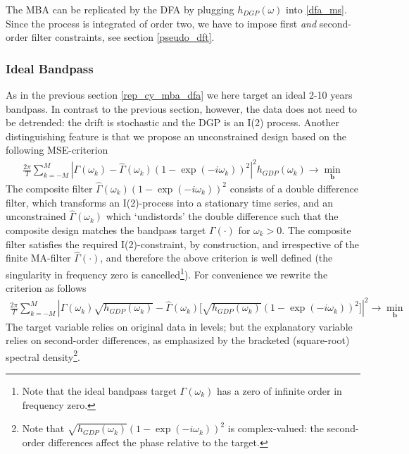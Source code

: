 \documentclass[a4paper]{book}
\begin{document}
The MBA can be replicated by the DFA by plugging $h_{DGP}(\omega)$ into \ref{dfa_ms}. Since the process is integrated of order two, we have to impose first \emph{and} second-order filter constraints, see section \ref{pseudo_dft}.  





\subsubsection{Ideal Bandpass}

As in the previous section \ref{rep_cy_mba_dfa} we here target an ideal 2-10 years bandpass. In contrast to the previous section, however, the data does not need to be detrended: the drift is stochastic and the DGP is an I(2) process. Another distinguishing feature is that we propose an unconstrained design based on the following MSE-criterion
\begin{eqnarray*}
\frac{2\pi}{T}\sum_{k=-M}^{M}\left|\Gamma(\omega_k)-\hat{\Gamma}(\omega_k) (1-\exp(-i\omega_k))^2\right|^2 h_{GDP}(\omega_k)\to\min_{\mathbf{b}} 
\end{eqnarray*}
The composite filter $\hat{\Gamma}(\omega_k) (1-\exp(-i\omega_k))^2$ consists of a double difference filter, which transforms an I(2)-process into a stationary time series, and an unconstrained $\hat{\Gamma}(\omega_k)$ which `undistords' the double difference such that the composite design matches the bandpass target $\Gamma(\cdot)$ for $\omega_k>0$. The composite filter satisfies the required I(2)-constraint, by construction, and irrespective of the finite MA-filter $\hat{\Gamma}(\cdot)$, and therefore the above criterion is well defined (the singularity in frequency zero is cancelled\footnote{Note that the ideal bandpass target $\Gamma(\omega_k)$ has a zero of infinite order in frequency zero.}). For convenience we rewrite the criterion as follows 
\begin{eqnarray*}
\frac{2\pi}{T}\sum_{k=-M}^{M}\left|\Gamma(\omega_k)\sqrt{h_{GDP}(\omega_k)}-\hat{\Gamma}(\omega_k)\bigg[\sqrt{h_{GDP}(\omega_k)} (1-\exp(-i\omega_k))^2\bigg]\right|^2 \to\min_{\mathbf{b}} 
\end{eqnarray*}
The target variable relies on original data in levels; but the explanatory variable relies on second-order differences, as emphasized by the bracketed (square-root) spectral density\footnote{Note that $\sqrt{h_{GDP}(\omega_k)} (1-\exp(-i\omega_k))^2$ is complex-valued: the second-order differences affect the phase relative to the target.}.
\end{document}
